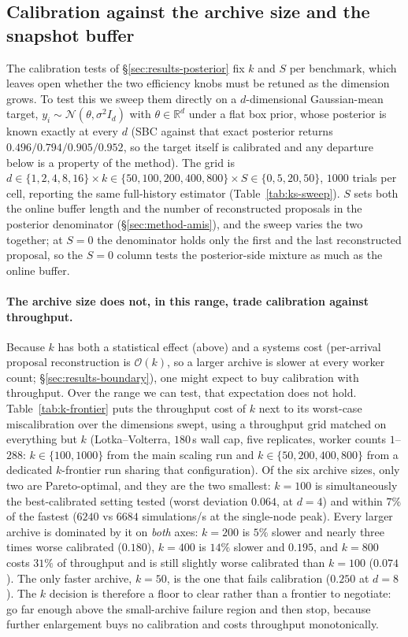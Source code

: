 \documentclass[pdflatex,sn-mathphys-num]{sn-jnl}
\theoremstyle{plain}
\theoremstyle{definition}
\begin{document}
\begin{appendices}
\subsection{Calibration against the archive size and the snapshot buffer}
The calibration tests of \S\ref{sec:results-posterior} fix $k$ and $S$ per benchmark, which leaves open whether the two efficiency knobs must be retuned as the dimension grows. To test this we sweep them directly on a $d$-dimensional Gaussian-mean target, $y_i\sim\mathcal N(\theta,\sigma^2 I_d)$ with $\theta\in\mathbb R^d$ under a flat box prior, whose posterior is known exactly at every $d$ (SBC against that exact posterior returns $0.496/0.794/0.905/0.952$, so the target itself is calibrated and any departure below is a property of the method). The grid is $d\in\{1,2,4,8,16\}\times k\in\{50,100,200,400,800\}\times S\in\{0,5,20,50\}$, $1000$ trials per cell, reporting the same full-history estimator (Table~\ref{tab:ks-sweep}). $S$ sets both the online buffer length and the number of reconstructed proposals in the posterior denominator (\S\ref{sec:method-amis}), and the sweep varies the two together; at $S=0$ the denominator holds only the first and the last reconstructed proposal, so the $S=0$ column tests the posterior-side mixture as much as the online buffer.

\paragraph{The archive size does not, in this range, trade calibration against throughput.} Because $k$ has both a statistical effect (above) and a systems cost (per-arrival proposal reconstruction is $\mathcal{O}(k)$, so a larger archive is slower at every worker count; \S\ref{sec:results-boundary}), one might expect to buy calibration with throughput. Over the range we can test, that expectation does not hold. Table~\ref{tab:k-frontier} puts the throughput cost of $k$ next to its worst-case miscalibration over the dimensions swept, using a throughput grid matched on everything but $k$ (Lotka--Volterra, $180$\,s wall cap, five replicates, worker counts $1$--$288$: $k\in\{100,1000\}$ from the main scaling run and $k\in\{50,200,400,800\}$ from a dedicated $k$-frontier run sharing that configuration). Of the six archive sizes, only two are Pareto-optimal, and they are the two smallest: $k=100$ is simultaneously the best-calibrated setting tested (worst deviation $0.064$, at $d=4$) and within $7\%$ of the fastest ($6240$ vs $6684$ simulations/s at the single-node peak). Every larger archive is dominated by it on \emph{both} axes: $k=200$ is $5\%$ slower and nearly three times worse calibrated ($0.180$), $k=400$ is $14\%$ slower and $0.195$, and $k=800$ costs $31\%$ of throughput and is still slightly worse calibrated than $k=100$ ($0.074$). The only faster archive, $k=50$, is the one that fails calibration ($0.250$ at $d=8$). The $k$ decision is therefore a floor to clear rather than a frontier to negotiate: go far enough above the small-archive failure region and then stop, because further enlargement buys no calibration and costs throughput monotonically.


\end{appendices}
\end{document}
